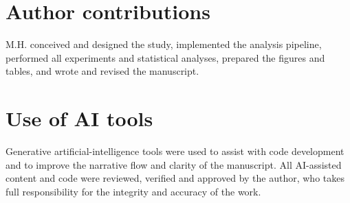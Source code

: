 \documentclass[11pt]{article}
\begin{document}
\section*{Author contributions}
M.H. conceived and designed the study, implemented the analysis pipeline,
performed all experiments and statistical analyses, prepared the figures and
tables, and wrote and revised the manuscript.

\section*{Use of AI tools}
Generative artificial-intelligence tools were used to assist with code
development and to improve the narrative flow and clarity of the manuscript.
All AI-assisted content and code were reviewed, verified and approved by the
author, who takes full responsibility for the integrity and accuracy of the
work.




\clearpage

\end{document}
